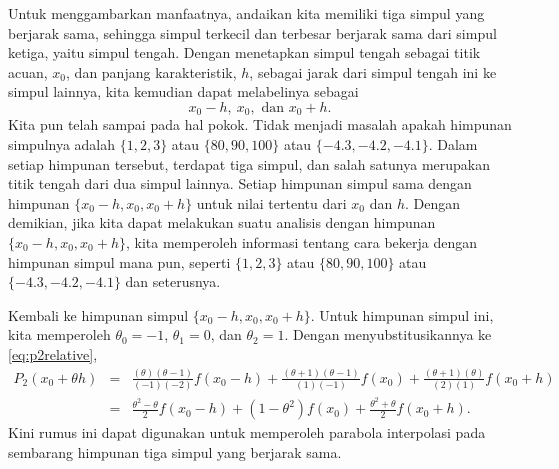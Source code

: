 Untuk menggambarkan manfaatnya, andaikan kita memiliki tiga simpul
yang berjarak sama, sehingga simpul terkecil dan terbesar berjarak
sama dari simpul ketiga, yaitu simpul tengah. Dengan menetapkan simpul
tengah sebagai titik acuan, $x_{0}$, dan panjang karakteristik, $h$,
sebagai jarak dari simpul tengah ini ke simpul lainnya, kita kemudian
dapat melabelinya sebagai
\[
x_{0}-h,\ x_{0},\mbox{ dan }x_{0}+h.
\]
Kita pun telah sampai pada hal pokok. Tidak menjadi masalah apakah
himpunan simpulnya adalah $\{1,2,3\}$ atau $\{80,90,100\}$ atau
$\{-4.3,-4.2,-4.1\}$. Dalam setiap himpunan tersebut, terdapat tiga
simpul, dan salah satunya merupakan titik tengah dari dua simpul lainnya.
Setiap himpunan simpul sama dengan himpunan $\{x_{0}-h,x_{0},x_{0}+h\}$
untuk nilai tertentu dari $x_{0}$ dan $h$. Dengan demikian, jika
kita dapat melakukan suatu analisis dengan himpunan $\{x_{0}-h,x_{0},x_{0}+h\}$,
kita memperoleh informasi tentang cara bekerja dengan himpunan simpul
mana pun, seperti $\{1,2,3\}$ atau $\{80,90,100\}$ atau $\{-4.3,-4.2,-4.1\}$
dan seterusnya. 

Kembali ke himpunan simpul $\{x_{0}-h,x_{0},x_{0}+h\}$. Untuk himpunan
simpul ini, kita memperoleh $\theta_{0}=-1$, $\theta_{1}=0$, dan
$\theta_{2}=1$. Dengan menyubstitusikannya ke \ref{eq:p2relative},
\begin{eqnarray*}
P_{2}(x_{0}+\theta h) & = & \frac{(\theta)(\theta-1)}{(-1)(-2)}f(x_{0}-h)+\frac{(\theta+1)(\theta-1)}{(1)(-1)}f(x_{0})+\frac{(\theta+1)(\theta)}{(2)(1)}f(x_{0}+h)\\
 & = & \frac{\theta^{2}-\theta}{2}f(x_{0}-h)+(1-\theta^{2})f(x_{0})+\frac{\theta^{2}+\theta}{2}f(x_{0}+h).
\end{eqnarray*}
Kini rumus ini dapat digunakan untuk memperoleh parabola interpolasi
pada sembarang himpunan tiga simpul yang berjarak sama. 

